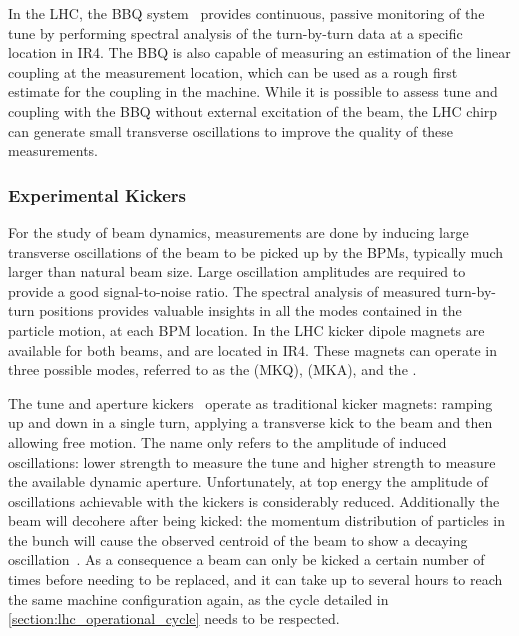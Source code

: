 In the LHC, the \gls{BBQ} system~\cite{CERN:Boccardi:LHC_Transverse_Diagnostics_Systems,CERN:Boccardi:LHC_BBQ_Tune_Chromaticity_Systems} provides continuous, passive monitoring of the tune by performing spectral analysis of the turn-by-turn data at a specific location in IR\num{4}.
The \gls{BBQ} is also capable of measuring an estimation of the linear coupling at the measurement location, which can be used as a rough first estimate for the coupling in the machine.
While it is possible to assess tune and coupling with the BBQ without external excitation of the beam, the LHC chirp can generate small transverse oscillations to improve the quality of these measurements.

\subsubsection*{Experimental Kickers}

For the study of beam dynamics, measurements are done by inducing large transverse oscillations of the beam to be picked up by the \glspl{BPM}, typically much larger than natural beam size.
Large oscillation amplitudes are required to provide a good signal-to-noise ratio.
The spectral analysis of measured turn-by-turn positions provides valuable insights in all the modes contained in the particle motion, at each BPM location.
In the \gls{LHC} kicker dipole magnets are available for both beams, and are located in IR\num{4}.
These magnets can operate in three possible modes, referred to as the  (MKQ),  (MKA), and the .

The tune and aperture kickers~\cite{CERN:Barlow:Control_MKQA_LHC,IPMS:Carlier:Kicker_Pulse_Generator_Measurement_Tune_Dynamic_Aperture_LHC} operate as traditional kicker magnets: ramping up and down in a single turn, applying a transverse kick to the beam and then allowing free motion.
The name only refers to the amplitude of induced oscillations: lower strength to measure the tune and higher strength to measure the available dynamic aperture.
Unfortunately, at top energy the amplitude of oscillations achievable with the kickers is considerably reduced.
Additionally the beam will decohere after being kicked: the momentum distribution of particles in the bunch will cause the observed centroid of the beam to show a decaying oscillation~\cite{Report:Meller:Decoherence_Kicked_Beams}.
As a consequence a beam can only be kicked a certain number of times before needing to be replaced, and it can take up to several hours to reach the same machine configuration again, as the cycle detailed in \cref{section:lhc_operational_cycle} needs to be respected.

